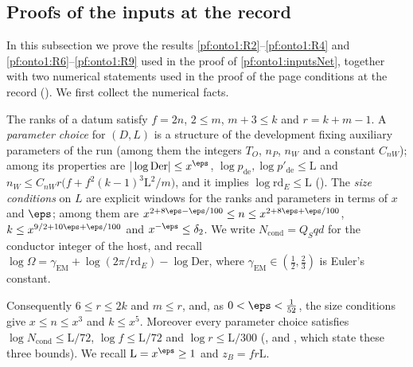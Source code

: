 \subsection{Proofs of the inputs at the record}\label{sec:pf:onto1:inputs}

In this subsection we prove the results \ref{pf:onto1:R2}--\ref{pf:onto1:R4} and \ref{pf:onto1:R6}--\ref{pf:onto1:R9} used in the
proof of \cref{pf:onto1:inputsNet}, together with two numerical statements used in the proof of the page conditions at
the record (). We first collect the numerical facts.

\begin{definition}\label{pf:onto1:parchoice}
The ranks of a datum satisfy $f=2n$, $2\le m$, $m+3\le k$ and $r=k+m-1$. A \emph{parameter choice} for $(D,L)$ is a
structure of the development fixing auxiliary parameters of the run (among them the integers $T_O$, $n_P$, $n_W$ and a
constant $C_{nW}$); among its properties are $|\log\mathrm{Der}|\le x^{\eps}$, $\log p_{\mathrm{de}},\log p'_{\mathrm{de}}\le\mathrm L$ and
$n_W\le C_{nW}r\bigl(f+f^2(k-1)^3\mathrm L^2/m\bigr)$, and it implies $\log\mathrm{rd}_E\le\mathrm L$
(). The \emph{size conditions} on $L$
are explicit windows for the ranks and parameters in terms of $x$ and $\eps$; among them are
$x^{2+8\eps-\eps/100}\le n\le x^{2+8\eps+\eps/100}$, $k\le x^{9/2+10\eps+\eps/100}$ and $x^{-\eps}\le\delta_2$. We write
$N_{\mathrm{cond}}=Q_Sqd$ for the conductor integer of the host, and recall $\log\Omega=\gamma_{\mathrm{EM}}+\log(2\pi/\mathrm{rd}_E)-\log
\mathrm{Der}$, where $\gamma_{\mathrm{EM}}\in(\frac12,\frac23)$ is Euler's constant.
\end{definition}

Consequently $6\le r\le2k$ and $m\le r$, and, as $0<\eps<\frac1{52}$, the size conditions give $x\le n\le x^3$ and $k\le x^5$.
Moreover every parameter choice satisfies $\log N_{\mathrm{cond}}\le\mathrm L/72$, $\log f\le\mathrm L/72$ and $\log r\le\mathrm L/300$
(,
 and
, which state these three bounds). We recall
$\mathrm L=x^{\eps}\ge1$ and $z_B=fr\mathrm L$.

